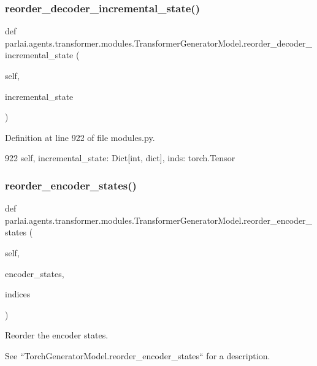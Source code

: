 \subsubsection{\texorpdfstring{reorder\+\_\+decoder\+\_\+incremental\+\_\+state()}{reorder\_decoder\_incremental\_state()}}
{\footnotesize\ttfamily def parlai.\+agents.\+transformer.\+modules.\+Transformer\+Generator\+Model.\+reorder\+\_\+decoder\+\_\+incremental\+\_\+state (\begin{DoxyParamCaption}\item[{}]{self,  }\item[{}]{incremental\+\_\+state }\end{DoxyParamCaption})}



Definition at line 922 of file modules.\+py.


\begin{DoxyCode}
922         self, incremental\_state: Dict[int, dict], inds: torch.Tensor
\end{DoxyCode}
\mbox{\label{classparlai_1_1agents_1_1transformer_1_1modules_1_1TransformerGeneratorModel_a9b9261bca59f10692c15cbaaa3ffce65}} 
\subsubsection{\texorpdfstring{reorder\+\_\+encoder\+\_\+states()}{reorder\_encoder\_states()}}
{\footnotesize\ttfamily def parlai.\+agents.\+transformer.\+modules.\+Transformer\+Generator\+Model.\+reorder\+\_\+encoder\+\_\+states (\begin{DoxyParamCaption}\item[{}]{self,  }\item[{}]{encoder\+\_\+states,  }\item[{}]{indices }\end{DoxyParamCaption})}

\begin{DoxyVerb}Reorder the encoder states.

See ``TorchGeneratorModel.reorder_encoder_states`` for a description.
\end{DoxyVerb}
 


